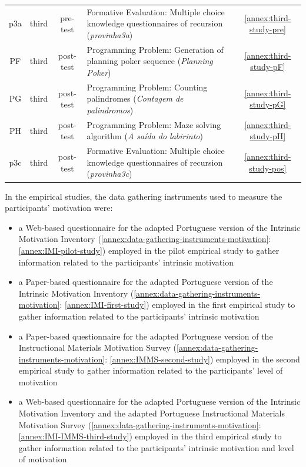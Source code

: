 {\begin{longtable}{cccp{9cm}c}
p3a&third&pre-test&
Formative Evaluation: Multiple choice knowledge questionnaires of recursion (\emph{provinha3a})&
\autoref{annex:third-study-pre}\tabularnewline

PF&third&post-test&
Programming Problem: Generation of planning poker sequence (\emph{Planning Poker})&
\autoref{annex:third-study-pF}\tabularnewline

PG&third&post-test&
Programming Problem: Counting palindromes (\emph{Contagem de palindromos})&
\autoref{annex:third-study-pG}\tabularnewline

PH&third&post-test&
Programming Problem: Maze solving algorithm (\emph{A saída do labirinto})&
\autoref{annex:third-study-pH}\tabularnewline

p3c&third&post-test&
Formative Evaluation: Multiple choice knowledge questionnaires of recursion (\emph{provinha3c})&
\autoref{annex:third-study-pos}\tabularnewline

\hline
\end{longtable}}


In the empirical studies, the data gathering instruments used to measure the participants' motivation were:

\begin{itemize}
\item
a Web-based questionnaire for the adapted Portuguese version of the Intrinsic Motivation Inventory (\autoref{annex:data-gathering-instruments-motivation}:
\autoref{annex:IMI-pilot-study}) employed in the pilot empirical study to gather information related to the participants' intrinsic motivation

\item
a Paper-based questionnaire for the adapted Portuguese version of the Intrinsic Motivation Inventory (\autoref{annex:data-gathering-instruments-motivation}:
\autoref{annex:IMI-first-study}) employed in the first empirical study to gather information related to the participants' intrinsic motivation

\item
a Paper-based questionnaire for the adapted Portuguese version of the Instructional Materials Motivation Survey (\autoref{annex:data-gathering-instruments-motivation}:
\autoref{annex:IMMS-second-study}) employed in the second empirical study to gather information related to the participants' level of motivation

\item
a Web-based questionnaire for the adapted Portuguese version of the Intrinsic Motivation Inventory and the adapted Portuguese Instructional Materials Motivation Survey (\autoref{annex:data-gathering-instruments-motivation}:
\autoref{annex:IMI-IMMS-third-study}) employed in the third empirical study to gather information related to the participants' intrinsic motivation and level of motivation
\end{itemize}

